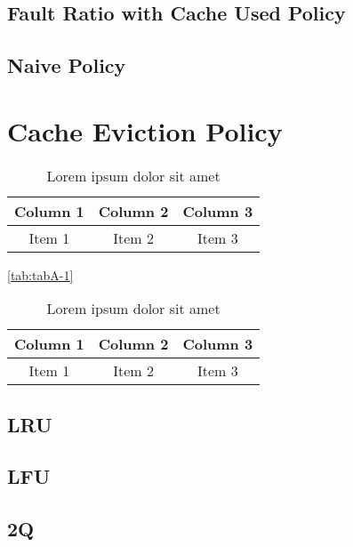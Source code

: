 \lipsum[1-1] \cite{reference-2}

\subsection{Fault Ratio with Cache Used Policy}

\lipsum[1-1] \cite{reference-3}

\subsection{Naive Policy}

\lipsum[1-1] \cite{reference-3}

\section{Cache Eviction Policy}

\begin{table}[ht!]
    \centering
    \begin{tabular}{c c c}
        \hline
        Column 1 & Column 2 & Column 3 \\
        \hline
        Item 1   & Item 2   & Item 3   \\
    \end{tabular}
    \caption{Lorem ipsum dolor sit amet}
    \label{tab:tabA-2}
\end{table}

\lipsum[1-1] \ref{tab:tabA-1}

\begin{table}[ht!]
    \centering
    \begin{tabular}{c c c}
        \hline
        Column 1 & Column 2 & Column 3 \\
        \hline
        Item 1   & Item 2   & Item 3   \\
    \end{tabular}
    \caption{Lorem ipsum dolor sit amet}
    \label{tab:tabB-2}
\end{table}

\lipsum[1-1]

\subsection{LRU}

\subsection{LFU}

\subsection{2Q}

